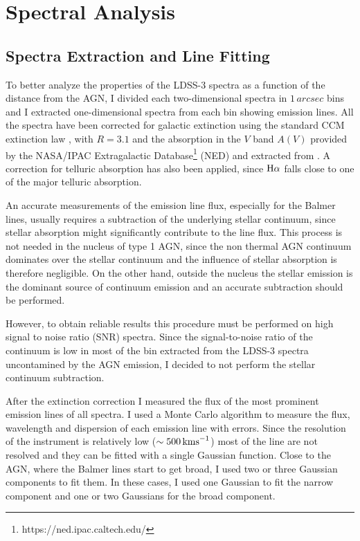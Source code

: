 \documentclass[../thesis.tex]{subfiles}
\begin{document}
\section{Spectral Analysis}
\label{sec:spectral_anal}

\subsection{Spectra Extraction and Line Fitting}
\label{sec:extraction}
To better analyze the properties of the LDSS-3 spectra as a function of the distance from the AGN, I divided each two-dimensional spectra in $1\,\si{arcsec}$ bins and I extracted one-dimensional spectra from each bin showing emission lines.
All the spectra have been corrected for galactic extinction using the standard CCM extinction law \citep{Cardelli89}, with $R = 3.1$ and the absorption in the $V$ band $A(V)$ provided by the NASA/IPAC Extragalactic Database\footnote{https://ned.ipac.caltech.edu/} (NED) and extracted from \citet{Schlafly11}.
A correction for telluric absorption has also been applied, since $\Ha$ falls close to one of the major telluric absorption.

An accurate measurements of the emission line flux, especially for the Balmer lines, usually requires a subtraction of the underlying stellar continuum, since stellar absorption might significantly contribute to the line flux.
This process is not needed in the nucleus of type 1 AGN, since the non thermal AGN continuum dominates over the stellar continuum and the influence of stellar absorption is therefore negligible.
On the other hand, outside the nucleus the stellar emission is the dominant source of continuum emission and an accurate subtraction should be performed.

However, to obtain reliable results this procedure must be performed on high signal to noise ratio (SNR) spectra.
Since the signal-to-noise ratio of the continuum is low in most of the bin extracted from the LDSS-3 spectra uncontamined by the AGN emission, I decided to not perform the stellar continuum subtraction.

After the extinction correction I measured the flux of the most prominent emission lines of all spectra.
I used a Monte Carlo algorithm to measure the flux, wavelength and dispersion of each emission line with errors.
Since the resolution of the instrument is relatively low ($\sim 500\,\si{\kms}$) most of the line are not resolved and they can be fitted with a single Gaussian function.
Close to the AGN, where the Balmer lines start to get broad, I used two or three Gaussian components to fit them.
In these cases, I used one Gaussian to fit the narrow component and one or two Gaussians for the broad component.
\end{document}
